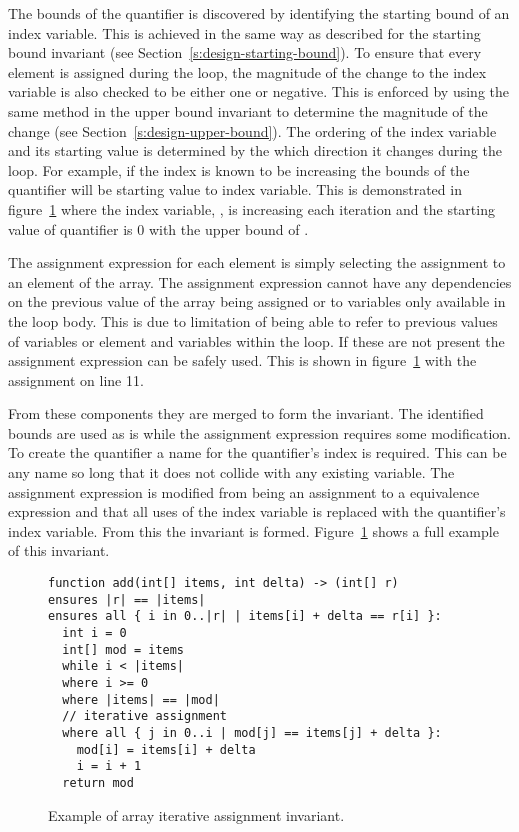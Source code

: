 The bounds of the quantifier is discovered by identifying the
starting bound of an index variable.
This is achieved in the same way as described for the starting bound
invariant (see Section~\ref{s:design-starting-bound}).
To ensure that every element is assigned during the loop, the magnitude of
the change to the index variable is also checked to be either one or negative.
This is enforced by using the same method in the upper bound invariant to
determine the magnitude of the change (see Section~\ref{s:design-upper-bound}).
The ordering of the index variable and its starting value is determined
by the which direction it changes during the loop.
For example, if the index is known to be increasing the bounds of the 
quantifier will be starting value to index variable.
This is demonstrated in figure~\ref{lst:array-iter-assign} where
the index variable, , is increasing each iteration and
the starting value of quantifier is 0 with the upper bound of .

The assignment expression for each element is simply selecting the
assignment to an element of the array.
The assignment expression cannot have any dependencies on the previous
value of the array being assigned or to variables only available in the loop body.
This is due to limitation of being able to refer to previous values of
variables or element and variables within the loop.
If these are not present the assignment expression can be
safely used.
This is shown in figure~\ref{lst:array-iter-assign} with the 
assignment on line 11.

From these components they are merged to form the invariant.
The identified bounds are used as is while the assignment expression
requires some modification.
To create the quantifier a name for the quantifier's index is required.
This can be any name so long that it does not collide with any existing variable.
The assignment expression is modified from being an assignment to a equivalence
expression and that all uses of the index variable is replaced with the
quantifier's index variable.
From this the invariant is formed.
Figure~\ref{lst:array-iter-assign} shows a full example of this invariant.

\begin{figure}[ht]
\begin{lstlisting}
function add(int[] items, int delta) -> (int[] r)
ensures |r| == |items|
ensures all { i in 0..|r| | items[i] + delta == r[i] }:
  int i = 0
  int[] mod = items
  while i < |items|
  where i >= 0
  where |items| == |mod|
  // iterative assignment
  where all { j in 0..i | mod[j] == items[j] + delta }:
    mod[i] = items[i] + delta
    i = i + 1
  return mod
\end{lstlisting}
\caption{Example of array iterative assignment invariant.}
\label{lst:array-iter-assign}
\end{figure}
